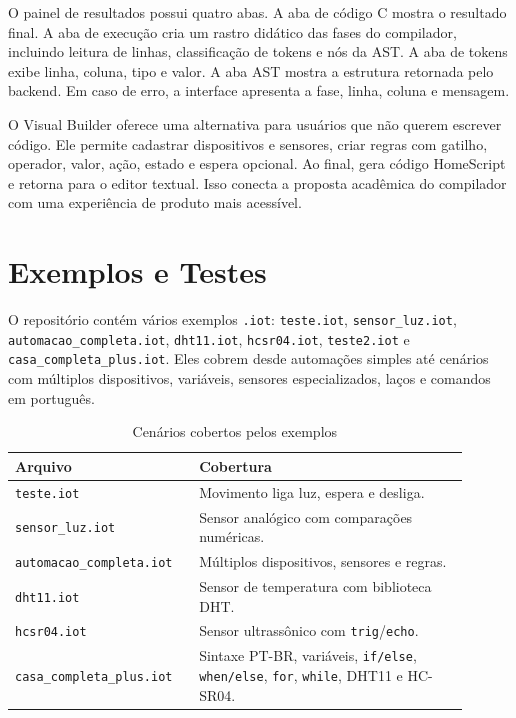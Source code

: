 \documentclass[conference]{IEEEtran}
\begin{document}
O painel de resultados possui quatro abas. A aba de código C mostra o resultado final. A aba de execução cria um rastro didático das fases do compilador, incluindo leitura de linhas, classificação de tokens e nós da AST. A aba de tokens exibe linha, coluna, tipo e valor. A aba AST mostra a estrutura retornada pelo backend. Em caso de erro, a interface apresenta a fase, linha, coluna e mensagem.

O Visual Builder oferece uma alternativa para usuários que não querem escrever código. Ele permite cadastrar dispositivos e sensores, criar regras com gatilho, operador, valor, ação, estado e espera opcional. Ao final, gera código HomeScript e retorna para o editor textual. Isso conecta a proposta acadêmica do compilador com uma experiência de produto mais acessível.

\section{Exemplos e Testes}

O repositório contém vários exemplos \texttt{.iot}: \texttt{teste.iot}, \texttt{sensor\_luz.iot}, \texttt{automacao\_completa.iot}, \texttt{dht11.iot}, \texttt{hcsr04.iot}, \texttt{teste2.iot} e \texttt{casa\_completa\_plus.iot}. Eles cobrem desde automações simples até cenários com múltiplos dispositivos, variáveis, sensores especializados, laços e comandos em português.

\begin{table}[htbp]
\caption{Cenários cobertos pelos exemplos}
\label{tab:exemplos}
\centering
\begin{tabular}{p{0.35\linewidth}p{0.55\linewidth}}
\toprule
\textbf{Arquivo} & \textbf{Cobertura} \\
\midrule
\texttt{teste.iot} & Movimento liga luz, espera e desliga. \\
\texttt{sensor\_luz.iot} & Sensor analógico com comparações numéricas. \\
\texttt{automacao\_completa.iot} & Múltiplos dispositivos, sensores e regras. \\
\texttt{dht11.iot} & Sensor de temperatura com biblioteca DHT. \\
\texttt{hcsr04.iot} & Sensor ultrassônico com \texttt{trig}/\texttt{echo}. \\
\texttt{casa\_completa\_plus.iot} & Sintaxe PT-BR, variáveis, \texttt{if/else}, \texttt{when/else}, \texttt{for}, \texttt{while}, DHT11 e HC-SR04. \\
\bottomrule
\end{tabular}
\end{table}
\end{document}
